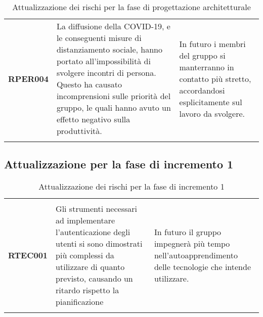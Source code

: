 \documentclass[../piano-di-progetto]{subfiles}
\begin{document}
\begin{longtable}[H]{|p{10em}|p{17em}|p{17em}|}
  \textbf{RPER004}                & La diffusione della COVID-19, e le conseguenti misure di distanziamento sociale, hanno portato all'impossibilità di svolgere incontri di persona. Questo ha causato incomprensioni sulle priorità del gruppo, le quali hanno avuto un effetto negativo sulla produttività.                                                                                                                                                                  & In futuro i membri del gruppo si manterranno in contatto più stretto, accordandosi esplicitamente sul lavoro da svolgere.                                                                                                                                                                                                                                                                                         \\
  \rowcolor{white}
  \caption{Attualizzazione dei rischi per la fase di progettazione architetturale}%
  \label{tab:attualizzazione_per_la_fase_di_progettazione_architetturale}
\end{longtable}

\subsection{Attualizzazione per la fase di incremento 1}%
\label{sub:attualizzazione_per_la_fase_di_incremento_1}

\begin{longtable}[H]{|p{10em}|p{17em}|p{17em}|}
  \rowcolor{darkgray!90!}
  \color{white}{\textbf{Rischio}} & \color{white}{\textbf{Gestione}}                                                                                                                                                        & \color{white}{\textbf{Monitoraggio}}                                                       \\
  \textbf{RTEC001}                & Gli strumenti necessari ad implementare l'autenticazione degli utenti si sono dimostrati più complessi da utilizzare di quanto previsto, causando un ritardo rispetto la pianificazione & In futuro il gruppo impegnerà più tempo nell'autoapprendimento delle tecnologie che intende utilizzare. \\
  \rowcolor{white}
  \caption{Attualizzazione dei rischi per la fase di incremento 1}%
  \label{tab:attualizzazione_per_la_fase_di_incremento_1}
\end{longtable}
\end{document}
